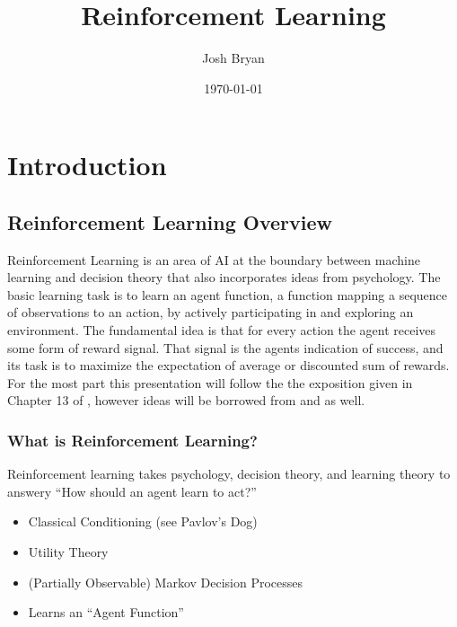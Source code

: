 \documentclass[ignorenonframetext]{beamer}
\title{Reinforcement Learning}
\author{Josh Bryan}
\institute{University of Illinois at Chicago, MCS 548}
\date{\today}
\begin{document}
\maketitle

\section{Introduction}


\subsection{Reinforcement Learning Overview}

	Reinforcement Learning is an area of AI at the boundary between machine
	learning and decision theory that also incorporates ideas from
	psychology.  The basic learning task is to learn an agent function,
	a function mapping a sequence of observations to an action, by
	actively participating in and exploring an environment.  The
	fundamental idea is that for every action the agent receives some form of
	reward signal.  That signal is the agents indication of success, and
	its task is to maximize the expectation of average or discounted sum
	of rewards.  For the most part this presentation will follow the
	the exposition given in Chapter 13 of \cite{mitchell_machine_1997},
	however ideas will be borrowed from
	\cite{kaelbling_reinforcement_1996} and
	\cite{russell_artificial_2010} as well.  

\begin{frame}
	\frametitle{What is Reinforcement Learning?}
	\begin{block}{}
		Reinforcement learning takes psychology, decision theory, and
		learning theory to answery ``How should an agent learn to act?''
	\end{block}
	\begin{itemize}
		\item Classical Conditioning (see Pavlov's Dog)
		\item Utility Theory
		\item (Partially Observable) Markov Decision Processes
		\item Learns an ``Agent Function''
	\end{itemize}
\end{frame}
\end{document}
